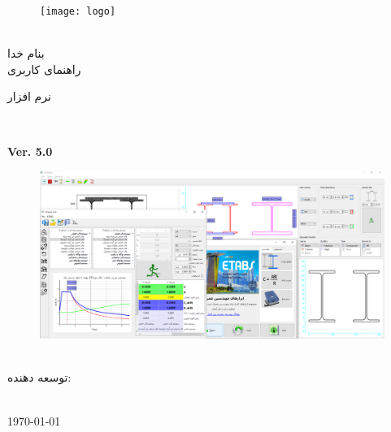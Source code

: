 \thispagestyle{empty}
\begin{figure}[!h]
\centerline{\texttt{[image: logo]}}
\end{figure}
\begin{center}
\vspace{-.8cm}



\\[1cm]
بنام خدا
\\[1cm]
راهنمای کاربری
\\[.8cm]
\begin{Huge}
نرم افزار 
\end{Huge}

\\[.5cm]
\begin{latin}
    \textbf{Ver. 5.0}
\end{latin}



\begin{figure}[ht]
    \centering
        \includegraphics[width=\linewidth]{figures/civiltools}
\end{figure}

\\[2.5cm]{ توسعه دهنده:}
\\[.3cm]
\textbf{{\large  \developer}}


\\[1.cm]
\today
\end{center}
\newpage
\thispagestyle{empty}
\setcounter{page}{1}
\tableofcontents
\newpage
